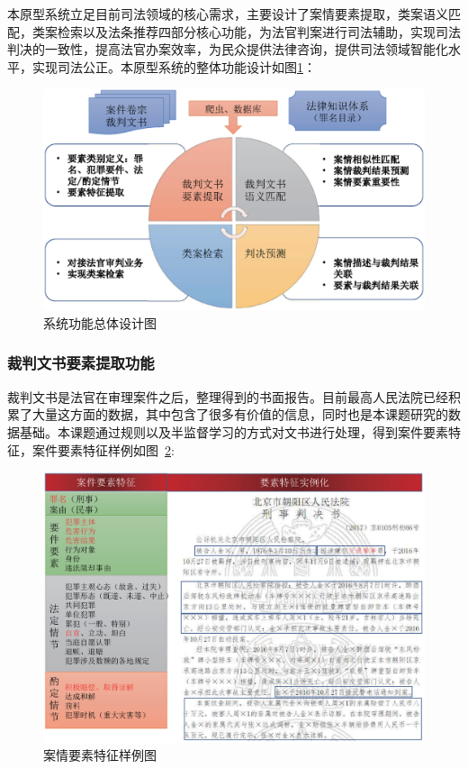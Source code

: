 本原型系统立足目前司法领域的核心需求，主要设计了案情要素提取，类案语义匹配，类案检索以及法条推荐四部分核心功能，为法官判案进行司法辅助，实现司法判决的一致性，提高法官办案效率，为民众提供法律咨询，提供司法领域智能化水平，实现司法公正。本原型系统的整体功能设计如图\ref{fig:sys_main}：
\begin{figure}[htbp]%
    \centering
    \includegraphics[scale=0.5, clip=true]{./sources/sys_main.eps}
    \caption{\label{fig:sys_main}系统功能总体设计图}
\end{figure}



\subsubsection{裁判文书要素提取功能}

裁判文书是法官在审理案件之后，整理得到的书面报告。目前最高人民法院已经积累了大量这方面的数据，其中包含了很多有价值的信息，同时也是本课题研究的数据基础。本课题通过规则以及半监督学习的方式对文书进行处理，得到案件要素特征，案件要素特征样例如图~\ref{fig:sys_element_demo}:
\begin{figure}[htbp]%
    \centering
    \includegraphics[scale=0.5, clip=true]{./sources/sys_element_demo.eps}
    \caption{\label{fig:sys_element_demo}案情要素特征样例图}
\end{figure}

